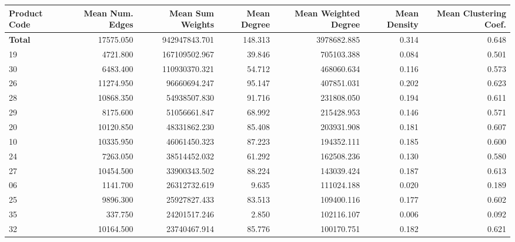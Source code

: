 \begin{tabular}{l|rrrrrr}
\toprule
Product Code & Mean Num. Edges & Mean Sum Weights & Mean Degree & Mean Weighted Degree & Mean Density & Mean Clustering Coef. \\
\midrule
          \textbf{Total} &       17575.050 &    942947843.701 &     148.313 &          3978682.885 &        0.314 &                 0.648 \\
          19 &        4721.800 &    167109502.967 &      39.846 &           705103.388 &        0.084 &                 0.501 \\
          30 &        6483.400 &    110930370.321 &      54.712 &           468060.634 &        0.116 &                 0.573 \\
          26 &       11274.950 &     96660694.247 &      95.147 &           407851.031 &        0.202 &                 0.623 \\
          28 &       10868.350 &     54938507.830 &      91.716 &           231808.050 &        0.194 &                 0.611 \\
          29 &        8175.600 &     51056661.847 &      68.992 &           215428.953 &        0.146 &                 0.571 \\
          20 &       10120.850 &     48331862.230 &      85.408 &           203931.908 &        0.181 &                 0.607 \\
          10 &       10335.950 &     46061450.323 &      87.223 &           194352.111 &        0.185 &                 0.600 \\
          24 &        7263.050 &     38514452.032 &      61.292 &           162508.236 &        0.130 &                 0.580 \\
          27 &       10454.500 &     33900343.502 &      88.224 &           143039.424 &        0.187 &                 0.613 \\
          06 &        1141.700 &     26312732.619 &       9.635 &           111024.188 &        0.020 &                 0.189 \\
          25 &        9896.300 &     25927827.433 &      83.513 &           109400.116 &        0.177 &                 0.602 \\
          35 &         337.750 &     24201517.246 &       2.850 &           102116.107 &        0.006 &                 0.092 \\
          32 &       10164.500 &     23740467.914 &      85.776 &           100170.751 &        0.182 &                 0.621 \\

\end{tabular}
